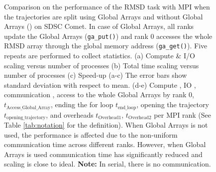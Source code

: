 \begin{figure}[ht!]
\caption{Comparison on the performance of the RMSD task with MPI when the trajectories are split using Global Arrays and without Global Arrays () on SDSC Comet.
In case of Global Arrays, all ranks update the Global Arrays (\texttt{ga\_put()}) and rank 0 accesses the whole RMSD array through the global memory address (\texttt{ga\_get()}).
Five repeats are performed to collect statistics. (a) Compute \& I/O scaling versus number of processes (b) Total time scaling versus number of processes (c) Speed-up (a-c) The error bars show standard deviation with respect to mean. (d-e) Compute \tcomp, IO \tIO, communication \tcomm, access to the whole Global Arrays by rank 0, \texttt{$t_{\text{Access\_Global\_Array}}$}, ending the for loop \texttt{$t_{\text{end\_loop}}$},
  opening the trajectory \texttt{$t_{\text{opening\_trajectory}}$}, and overheads \texttt{$t_{\text{Overhead1}}$},  \texttt{$t_{\text{Overhead2}}$} per MPI rank (See Table \ref{tab:notation} for the definition). When Global Arrays is not used, the performance is affected due to the non-uniform communication time across different ranks. However, when Global Arrays is used communication time has significantly reduced and scaling is close to ideal. \textbf{Note:} In serial, there is no communication.}
\label{fig:MPIwithIO-split}
\end{figure}

